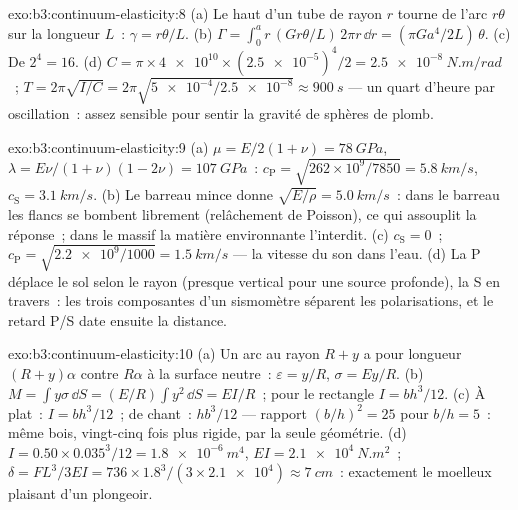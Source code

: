 \begin{solution}{exo:b3:continuum-elasticity:8}
(a) Le haut d'un tube de rayon $r$ tourne de l'arc $r\theta$ sur la
longueur $L$~: $\gamma = r\theta/L$. (b) $\Gamma = \int_0^a r\,(G r\theta/L)\,
2\pi r\,\dd r = (\pi Ga^4/2L)\,\theta$. (c) De $2^4 = 16$. (d) $C =
\pi \times \num{4e10} \times (\num{2.5e-5})^4/2 =
\qty{2.5e-8}{N.m/rad}$~; $T = 2\pi\sqrt{I/C} = 2\pi\sqrt{\num{5e-4}/
\num{2.5e-8}} \approx \qty{900}{s}$ --- un quart d'heure par
oscillation~: assez sensible pour sentir la gravité de sphères de plomb.
\end{solution}

\begin{solution}{exo:b3:continuum-elasticity:9}
(a) $\mu = E/2(1+\nu) = \qty{78}{GPa}$, $\lambda = E\nu/(1+\nu)(1-2\nu)
= \qty{107}{GPa}$~: $c_{\text{P}} = \sqrt{262\times10^9/7850} =
\qty{5.8}{km/s}$, $c_{\text{S}} = \qty{3.1}{km/s}$. (b) Le barreau
mince donne $\sqrt{E/\rho} = \qty{5.0}{km/s}$~: dans le barreau les
flancs se bombent librement (relâchement de Poisson), ce qui assouplit
la réponse~; dans le massif la matière environnante l'interdit. (c)
$c_{\text{S}} = 0$~; $c_{\text{P}} = \sqrt{\num{2.2e9}/1000} = \qty{1.5}{km/s}$ --- la
vitesse du son dans l'eau. (d) La P déplace le sol selon le rayon
(presque vertical pour une source profonde), la S en travers~: les
trois composantes d'un sismomètre séparent les polarisations, et le
retard P/S date ensuite la distance.
\end{solution}

\begin{solution}{exo:b3:continuum-elasticity:10}
(a) Un arc au rayon $R + y$ a pour longueur $(R + y)\alpha$ contre
$R\alpha$ à la surface neutre~: $\varepsilon = y/R$, $\sigma =
Ey/R$. (b) $M = \int y\sigma\,\dd S = (E/R)\int y^2\,\dd S = EI/R$~;
pour le rectangle $I = bh^3/12$. (c) À plat~: $I = bh^3/12$~; de chant~:
$hb^3/12$ --- rapport $(b/h)^2 = 25$ pour $b/h = 5$~: même bois,
vingt-cinq fois plus rigide, par la seule géométrie. (d) $I = 0.50 \times
0.035^3/12 = \qty{1.8e-6}{m^4}$, $EI = \qty{2.1e4}{N.m^2}$~; $\delta =
FL^3/3EI = 736 \times 1.8^3/(3 \times \num{2.1e4}) \approx
\qty{7}{cm}$~: exactement le moelleux plaisant d'un plongeoir.
\end{solution}

